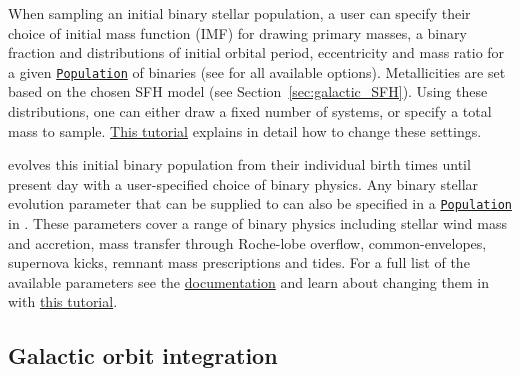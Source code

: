 \documentclass[twocolumn, twocolappendix, oneside]{aastex631}
\newcommand{\codeLink}[2]{{\href{https://cogsworth.readthedocs.io/en/latest/api/cogsworth.#2.#1.html}{\color{codecolour} \texttt{#1}}}}
\newcommand{\tutorialLink}[2]{\href{#1}{{\color{codecolour}#2}}}
\begin{document}
When sampling an initial binary stellar population, a user can specify their choice of initial mass function (IMF) for drawing primary masses, a binary fraction and distributions of initial orbital period, eccentricity and mass ratio for a given \codeLink{Population}{pop} of binaries (see \citealp[Section 2.1.1 of][]{COSMIC} for all available options). Metallicities are set based on the chosen SFH model (see Section~\ref{sec:galactic_SFH}). Using these distributions, one can either draw a fixed number of systems, or specify a total mass to sample. \tutorialLink{https://cogsworth.readthedocs.io/en/latest/tutorials/pop_settings/sampling.html}{This tutorial} explains in detail how to change these settings.

\cogsworth evolves this initial binary population from their individual birth times until present day with a user-specified choice of binary physics. Any binary stellar evolution parameter that can be supplied to \cosmic can also be specified in a \codeLink{Population}{pop} in \cogsworth. These parameters cover a range of binary physics including stellar wind mass and accretion, mass transfer through Roche-lobe overflow, common-envelopes, supernova kicks, remnant mass prescriptions and tides. For a full list of the available parameters see the \href{https://cosmic-popsynth.github.io}{\cosmic documentation} and learn about changing them in \cogsworth with \tutorialLink{https://cogsworth.readthedocs.io/en/latest/tutorials/pop_settings/pop_synth.html}{this tutorial}.

\subsection{Galactic orbit integration}\label{sec:orbit_integration}
\end{document}
